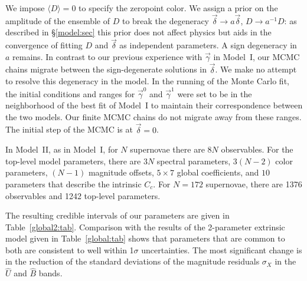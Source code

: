 \documentclass{aastex61}   	%
\begin{document}
We impose
$\langle D\rangle=0$
to specify the zeropoint color.  We assign a prior on the amplitude of the ensemble of $D$ to break the
degeneracy $\vec{\delta} \rightarrow a\vec{\delta}$, $D \rightarrow a^{-1}D$: as described
in \S\ref{model:sec} this prior does not affect physics but aids in the convergence of fitting $D$ and $\vec{\delta}$ as independent parameters.
A sign degeneracy in $a$ remains.
In contrast to our previous experience with $\vec{\gamma}$ in Model~I, our MCMC chains migrate between
the sign-degenerate solutions in  $\vec{\delta}$.  We make
no attempt to resolve this degeneracy in the model.
In the running of the Monte Carlo fit, the initial conditions and ranges for
$\vec{\gamma}^0$ and $\vec{\gamma}^1$ were set to be in the neighborhood of the best fit of Model~I
to maintain their correspondence between the two models.
Our finite MCMC chains do not migrate away from these ranges.
The
initial step of the MCMC is at $\vec{\delta}=0$.

In Model~II,
as in Model~I,
for $N$ supernovae there are $8N$ observables.  For the top-level model parameters, there are $3N$ spectral parameters, $3(N-2)$
color parameters, $(N-1)$ magnitude offsets,  $5 \times 7$ global coefficients, and $10$ parameters that describe the intrinsic
$C_c$.  For $N=172$ supernovae, there are 1376 observables and 1242 top-level parameters.

The resulting credible intervals of our parameters are given in Table~\ref{global2:tab}.  Comparison with the
results of the 2-parameter extrinsic model given in Table~\ref{global:tab} shows that  parameters that are common to both
are consistent  to well within 1$\sigma$ uncertainties.  The most significant change is in the reduction of the standard
deviations of the magnitude residuals $\sigma_X$
in the ${\hat{U}}$ and ${\hat{B}}$ bands.
\end{document}

